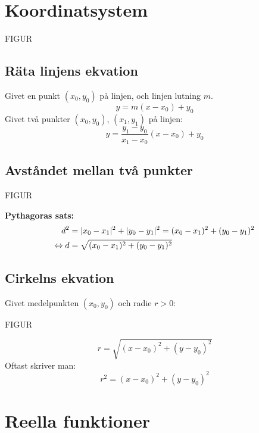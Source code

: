 \section{Koordinatsystem} %
\label{sec:koordinatsystem}
\begin{center}
    FIGUR
\end{center}
\subsection{Räta linjens ekvation} %
\label{sub:r_ta_linjens_ekvation}
Givet en punkt $(x_0, y_0)$ på linjen, och linjen lutning $m$.
\[
y = m(x - x_0) + y_0
\]
Givet två punkter $(x_0, y_0)$, $(x_1, y_1)$ på linjen:
\[
y = \frac{y_1 - y_0}{x_1 - x_0}(x - x_0) + y_0
\]
\subsection{Avståndet mellan två punkter} %
\label{sub:avst_ndet_mellan_tv_punkter}
\begin{center}
    FIGUR
\end{center}
\textbf{Pythagoras sats:} 
\begin{align*}
    d^2 &= \lvert x_0 - x_1\rvert^2 + \lvert y_0 - y_1\rvert^2 = (x_0 - x_1)^2 + (y_0 - y_1)^2\\ 
    \Leftrightarrow d &= \sqrt{(x_0 - x_1)^2 + (y_0 - y_1)^2}
\end{align*}
\subsection{Cirkelns ekvation} %
\label{sub:cirkelns_ekvation}

Givet medelpunkten $(x_0, y_0)$ och radie $r > 0$:
\begin{center}
    FIGUR
\end{center}
\[
r = \sqrt{(x-x_0)^2 + (y-y_0)^2}
\]
Oftast skriver man:
\[
r^2 = (x-x_0)^2 + (y-y_0)^2
\]

\section{Reella funktioner} %
\label{sec:reella_funktioner}

